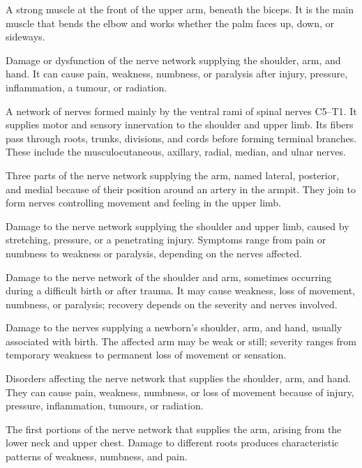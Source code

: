  A strong muscle at the front of the upper arm, beneath the biceps. It is the main muscle that bends the elbow and works whether the palm faces up, down, or sideways.

 Damage or dysfunction of the nerve network supplying the shoulder, arm, and hand. It can cause pain, weakness, numbness, or paralysis after injury, pressure, inflammation, a tumour, or radiation.

 A network of nerves formed mainly by the ventral rami of spinal nerves C5–T1.
It supplies motor and sensory innervation to the shoulder and upper limb. Its fibers pass through roots, trunks, divisions, and cords before forming terminal branches.
These include the musculocutaneous, axillary, radial, median, and ulnar nerves.

 Three parts of the nerve network supplying the arm, named lateral, posterior, and medial because of their position around an artery in the armpit. They join to form nerves controlling movement and feeling in the upper limb.

 Damage to the nerve network supplying the shoulder and upper limb, caused by stretching, pressure, or a penetrating injury. Symptoms range from pain or numbness to weakness or paralysis, depending on the nerves affected.

 Damage to the nerve network of the shoulder and arm, sometimes occurring during a difficult birth or after trauma. It may cause weakness, loss of movement, numbness, or paralysis; recovery depends on the severity and nerves involved.

 Damage to the nerves supplying a
newborn's shoulder, arm, and hand, usually associated with birth. The affected
arm may be weak or still; severity ranges from temporary weakness to permanent
loss of movement or sensation.

 Disorders affecting the nerve network that supplies the shoulder, arm, and hand. They can cause pain, weakness, numbness, or loss of movement because of injury, pressure, inflammation, tumours, or radiation.

 The first portions of the nerve network that supplies the arm, arising from the lower neck and upper chest. Damage to different roots produces characteristic patterns of weakness, numbness, and pain.


